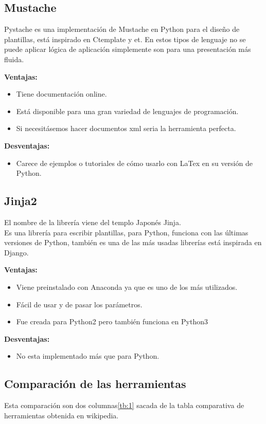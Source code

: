\subsection{Mustache}
Pystache es una implementación de Mustache en Python para el diseño de plantillas, está inspirado en Ctemplate y et.
En estos tipos de lenguaje no se puede aplicar lógica de aplicación simplemente son para una presentación más fluida.

\textbf{Ventajas:}

\begin{itemize}
\item Tiene documentación online.
\item Está disponible para una gran variedad de lenguajes de programación.
\item Si necesitásemos hacer documentos xml seria la herramienta perfecta.
\end{itemize}

\textbf{Desventajas:}
\begin{itemize}
\item Carece de ejemplos o tutoriales de cómo usarlo con LaTex en su versión de Python.
\end{itemize}


\subsection{Jinja2}

El nombre de la librería viene del templo Japonés Jinja.\\
Es una librería para escribir plantillas, para Python, funciona con las últimas versiones de Python, también es una de las más usadas librerías está inspirada en Django.


\textbf{Ventajas:}
\begin{itemize}
\item Viene preinstalado con Anaconda ya que es uno de los más utilizados.
\item Fácil de usar y de pasar los parámetros.
\item Fue creada para Python2 pero también funciona en Python3
\end{itemize}
\textbf{Desventajas:}
\begin{itemize}
\item No esta implementado más que para Python.
\end{itemize}

\subsection{Comparación de las herramientas}
Esta comparación son dos columnas\ref{tb:1} sacada de la tabla comparativa de herramientas obtenida en wikipedia.


